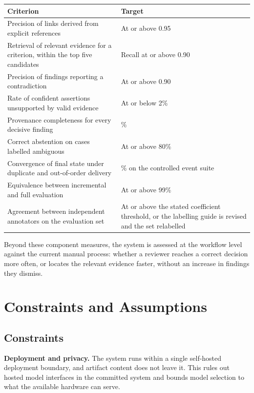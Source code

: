 \begin{longtable}{>{\raggedright\arraybackslash}p{}>{\raggedright\arraybackslash}p{}}
\toprule
Criterion & Target \\
\midrule
\endhead
Precision of links derived from explicit references & At or above 0.95 \\
Retrieval of relevant evidence for a criterion, within the top five candidates
  & Recall at or above 0.90 \\
Precision of findings reporting a contradiction & At or above 0.90 \\
Rate of confident assertions unsupported by valid evidence & At or below 2\% \\
Provenance completeness for every decisive finding & 100\% \\
Correct abstention on cases labelled ambiguous & At or above 80\% \\
Convergence of final state under duplicate and out-of-order delivery & 100\% on
  the controlled event suite \\
Equivalence between incremental and full evaluation & At or above 99\% \\
Agreement between independent annotators on the evaluation set & At or above the
  stated coefficient threshold, or the labelling guide is revised and the set
  relabelled \\
\bottomrule
\end{longtable}

Beyond these component measures, the system is assessed at the workflow level
against the current manual process: whether a reviewer reaches a correct
decision more often, or locates the relevant evidence faster, without an
increase in findings they dismiss.

\section{Constraints and Assumptions}

\subsection*{Constraints}

\textbf{Deployment and privacy.} The system runs within a single self-hosted
deployment boundary, and artifact content does not leave it. This rules out
hosted model interfaces in the committed system and bounds model selection to
what the available hardware can serve.


